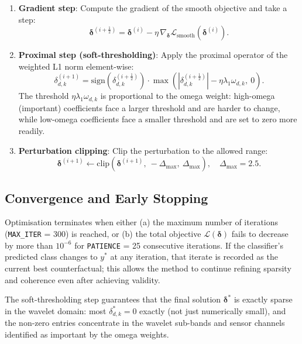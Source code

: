 \begin{enumerate}
    \item \textbf{Gradient step}: Compute the gradient of the smooth objective and take a step:
    \begin{equation}
        \boldsymbol{\delta}^{(i+\frac{1}{2})} = \boldsymbol{\delta}^{(i)} - \eta \, \nabla_{\boldsymbol{\delta}} \mathcal{L}_{\text{smooth}}\!\left(\boldsymbol{\delta}^{(i)}\right).
    \end{equation}

    \item \textbf{Proximal step (soft-thresholding)}: Apply the proximal operator of the weighted L1 norm element-wise:
    \begin{equation}
        \delta^{(i+1)}_{d,k} = \text{sign}\!\left(\delta^{(i+\frac{1}{2})}_{d,k}\right) \cdot \max\!\left(\left|\delta^{(i+\frac{1}{2})}_{d,k}\right| - \eta \lambda_1 \omega_{d,k},\ 0\right).
    \end{equation}
    The threshold $\eta \lambda_1 \omega_{d,k}$ is proportional to the omega weight: high-omega (important) coefficients face a larger threshold and are harder to change, while low-omega coefficients face a smaller threshold and are set to zero more readily.

    \item \textbf{Perturbation clipping}: Clip the perturbation to the allowed range:
    \begin{equation}
        \boldsymbol{\delta}^{(i+1)} \leftarrow \text{clip}\!\left(\boldsymbol{\delta}^{(i+1)},\ -\Delta_{\max},\ \Delta_{\max}\right), \quad \Delta_{\max} = 2.5.
    \end{equation}
\end{enumerate}

\subsection{Convergence and Early Stopping}

Optimisation terminates when either (a) the maximum number of iterations (\texttt{MAX\_ITER} = 300) is reached, or (b) the total objective $\mathcal{L}(\boldsymbol{\delta})$ fails to decrease by more than $10^{-6}$ for \texttt{PATIENCE} = 25 consecutive iterations. If the classifier's predicted class changes to $y^*$ at any iteration, that iterate is recorded as the current best counterfactual; this allows the method to continue refining sparsity and coherence even after achieving validity.

The soft-thresholding step guarantees that the final solution $\boldsymbol{\delta}^*$ is exactly sparse in the wavelet domain: most $\delta^*_{d,k} = 0$ exactly (not just numerically small), and the non-zero entries concentrate in the wavelet sub-bands and sensor channels identified as important by the omega weights.


